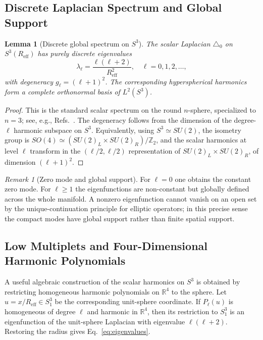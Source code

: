 \documentclass[
  aps,
  prd,
  reprint,
  superscriptaddress,
  nofootinbib,
  longbibliography,
  floatfix,
  amsmath,
  amssymb
]{revtex4-2}
\theoremstyle{plain}
\newtheorem{lemma}[theorem]{Lemma}
\theoremstyle{definition}
\theoremstyle{remark}
\newtheorem{remark}[theorem]{Remark}
\newcommand{\Sthree}{S^3}
\newcommand{\Reff}{R_{\mathrm{eff}}}
\begin{document}
\subsection{Discrete Laplacian Spectrum and Global Support}

\begin{lemma}[Discrete global spectrum on $S^3$]
  \label{lem:discrete}
  The scalar Laplacian $\triangle_0$ on $\Sthree(\Reff)$ has purely
  discrete eigenvalues
  \begin{equation}
    \lambda_\ell = \frac{\ell(\ell+2)}{\Reff^2},
    \quad \ell=0,1,2,\ldots,
    \label{eq:eigenvalues}
  \end{equation}
  with degeneracy $g_\ell=(\ell+1)^2$. The corresponding
  hyperspherical harmonics form a complete orthonormal basis of
  $L^2(\Sthree)$.
\end{lemma}

\begin{proof}
  This is the standard scalar spectrum on the round $n$-sphere,
  specialized to $n=3$; see, e.g., Refs.~\cite{Camporesi1994,Berger1971}.
  The degeneracy follows from the dimension of the degree-$\ell$
  harmonic subspace on $S^3$. Equivalently, using
  $\Sthree\simeq SU(2)$, the isometry group is
  $SO(4)\simeq (SU(2)_L\times SU(2)_R)/\mathbb{Z}_2$, and the scalar
  harmonics at level $\ell$ transform in the $(\ell/2,\ell/2)$
  representation of $SU(2)_L\times SU(2)_R$, of dimension $(\ell+1)^2$.
\end{proof}

\begin{remark}[Zero mode and global support]
  For $\ell=0$ one obtains the constant zero mode. For $\ell\geq1$ the
  eigenfunctions are non-constant but globally defined across the whole
  manifold. A nonzero eigenfunction cannot vanish on an open set by the
  unique-continuation principle for elliptic operators; in this precise
  sense the compact modes have global support rather than finite spatial
  support.
\end{remark}

\subsection{Low Multiplets and Four-Dimensional Harmonic Polynomials}
\label{subsec:lowell}

A useful algebraic construction of the scalar harmonics on $S^3$ is obtained
by restricting homogeneous harmonic polynomials on $\mathbb{R}^4$ to the
sphere. Let $u=x/\Reff\in S^3_1$ be the corresponding unit-sphere coordinate.
If $P_\ell(u)$ is homogeneous of degree $\ell$ and harmonic in $\mathbb{R}^4$,
then its restriction to $S^3_1$ is an eigenfunction of the unit-sphere
Laplacian with eigenvalue $\ell(\ell+2)$. Restoring the radius gives
Eq.~\eqref{eq:eigenvalues}.
\end{document}
